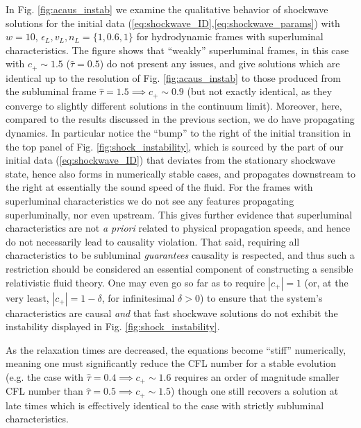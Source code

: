\documentclass[%
notitlepage,
superscriptaddress,
nofootinbib,
amsmath,
amssymb,
aps,
twocolumn
]{revtex4-1}
\begin{document}
In Fig. \ref{fig:acaus_instab} we examine the qualitative behavior of
shockwave solutions for the initial data
(\ref{eq:shockwave_ID},\ref{eq:shockwave_params}) with $w = 10$,
$\epsilon_{L}, v_{L}, n_{L} = \{1, 0.6, 1\}$ for hydrodynamic frames
with superluminal characteristics.  The figure shows that ``weakly''
superluminal frames, in this case with $c_+ \sim 1.5$
($\hat{\tau} = 0.5$)
do not present any issues, and give solutions which are identical
up to the resolution of Fig. \ref{fig:acaus_instab} to those produced
from the subluminal frame ${\hat{\tau} = 1.5 \implies c_+ \sim 0.9}$ (but
not exactly identical, as they converge to slightly different solutions in
the continuum limit).
Moreover, here, compared to the results discussed in the previous section,
we do have propagating dynamics. In particular notice the ``bump'' to the
right of the initial transition in the top panel of Fig.
\ref{fig:shock_instability}, which is sourced by the part of our initial
data (\ref{eq:shockwave_ID}) that deviates from the stationary shockwave
state, hence also forms in numerically stable cases, and propagates
downstream to the right at essentially the sound speed of the fluid. For
the frames with superluminal characteristics we do not see any
features propagating superluminally, nor even upstream. This gives further
evidence that superluminal characteristics are not {\em a priori} related
to physical propagation speeds, and hence do not necessarily lead to
causality violation.  That said, requiring all characteristics to be
subluminal \textit{guarantees} causality is respected, and thus such a
restriction should be considered an essential component of constructing a
sensible relativistic fluid theory.
One may even go so far as to require $|c_+| = 1$ (or, at the very least, $|c_+| = 1 - \delta$, for infinitesimal $\delta > 0$) to ensure that the system's characteristics are causal \textit{and} that fast shockwave solutions do not exhibit the instability displayed in Fig. \ref{fig:shock_instability}.

As the relaxation times are decreased, the equations become ``stiff''
numerically, meaning one must significantly reduce the CFL number for a
stable evolution (e.g. the case with $\hat{\tau} = 0.4 \implies c_+ \sim
1.6$ requires an order of magnitude smaller CFL number than $\hat{\tau} =
0.5 \implies c_+ \sim 1.5$) though one still recovers a solution at late
times which is effectively identical to the case with strictly
subluminal characteristics.  
\end{document}
